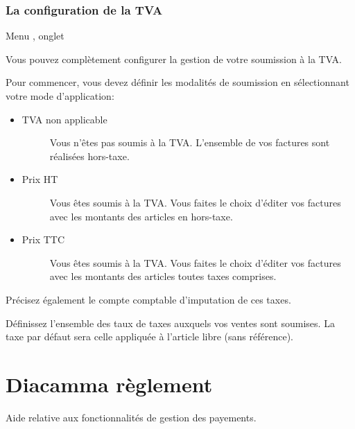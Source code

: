 \documentclass[a4paper,10pt,oneside,french]{sphinxmanual}
\begin{document}
\subsection{La configuration de la TVA}
\label{\detokenize{invoice/configuration:la-configuration-de-la-tva}}
Menu , onglet 

Vous pouvez complètement configurer la gestion de votre soumission à la TVA.

\noindent{}

Pour commencer, vous devez définir les modalités de soumission en sélectionnant votre mode d’application:
\begin{itemize}
\item {} \begin{description}
\item[{TVA non applicable}] \leavevmode
Vous n’êtes pas soumis à la TVA. L’ensemble de vos factures sont réalisées hors-taxe.

\end{description}

\item {} \begin{description}
\item[{Prix HT}] \leavevmode
Vous êtes soumis à la TVA. Vous faites le choix d’éditer vos factures avec les montants des articles en hors-taxe.

\end{description}

\item {} \begin{description}
\item[{Prix TTC}] \leavevmode
Vous êtes soumis à la TVA. Vous faites le choix d’éditer vos factures avec les montants des articles toutes taxes comprises.

\end{description}

\end{itemize}

Précisez également le compte comptable d’imputation de ces taxes.

Définissez l’ensemble des taux de taxes auxquels vos ventes sont soumises. La taxe par défaut sera celle appliquée à l’article libre (sans référence).


\chapter{Diacamma règlement}
\label{\detokenize{payoff/index:diacamma-reglement}}\label{\detokenize{payoff/index::doc}}
Aide relative aux fonctionnalités de gestion des payements.
\end{document}
